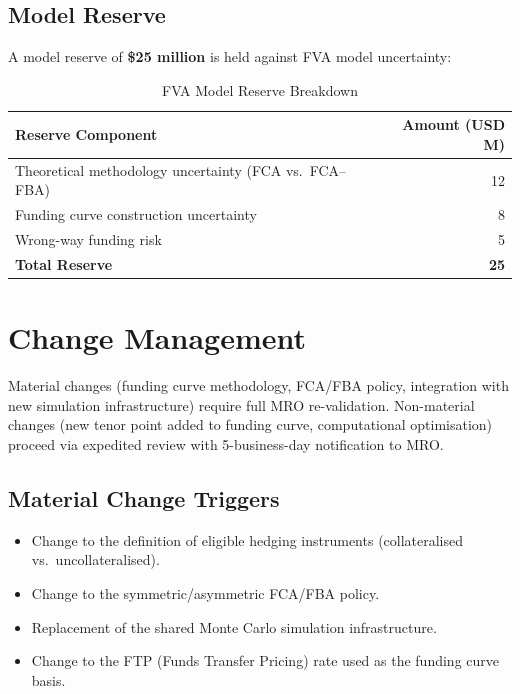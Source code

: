 \documentclass[11pt,a4paper]{article}
\begin{document}
\subsection{Model Reserve}

A model reserve of \textbf{\$25 million} is held against FVA model uncertainty:

\begin{table}[h!]
\centering
\caption{FVA Model Reserve Breakdown}
\begin{tabular}{@{}lr@{}}
\toprule
\textbf{Reserve Component} & \textbf{Amount (USD M)} \\
\midrule
Theoretical methodology uncertainty (FCA vs.\ FCA--FBA) & 12 \\
Funding curve construction uncertainty                   & 8 \\
Wrong-way funding risk                                   & 5 \\
\midrule
\textbf{Total Reserve}                                   & \textbf{25} \\
\bottomrule
\end{tabular}
\end{table}

\section{Change Management}

Material changes (funding curve methodology, FCA/FBA policy, integration with new simulation
infrastructure) require full MRO re-validation. Non-material changes (new tenor point added to
funding curve, computational optimisation) proceed via expedited review with 5-business-day
notification to MRO.

\subsection{Material Change Triggers}

\begin{itemize}[leftmargin=*]
  \item Change to the definition of eligible hedging instruments (collateralised vs.\ uncollateralised).
  \item Change to the symmetric/asymmetric FCA/FBA policy.
  \item Replacement of the shared Monte Carlo simulation infrastructure.
  \item Change to the FTP (Funds Transfer Pricing) rate used as the funding curve basis.
\end{itemize}
\end{document}
